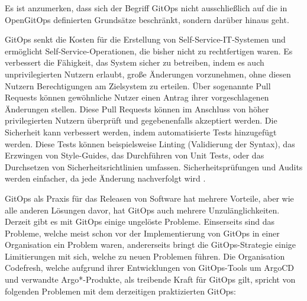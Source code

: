 Es ist anzumerken, dass sich der Begriff GitOps nicht ausschließlich auf
die in OpenGitOps definierten Grundsätze beschränkt,
sondern darüber hinaus geht.
\bigskip

GitOps senkt die Kosten für die Erstellung von Self-Service-IT-Systemen und ermöglicht Self-Service-Operationen, die bisher nicht zu rechtfertigen waren.
Es verbessert die Fähigkeit, das System sicher zu betreiben, indem es auch
unprivilegierten Nutzern erlaubt, große Änderungen vorzunehmen,
ohne diesen Nutzern Berechtigungen am Zielsystem zu erteilen.
Über sogenannte Pull Requests können gewöhnliche Nutzer einen Antrag
ihrer vorgeschlagenen Änderungen stellen.
Diese Pull Requests können im Anschluss von höher privilegierten Nutzern
überprüft und gegebenenfalls akzeptiert werden.
Die Sicherheit kann verbessert werden, 
indem automatisierte Tests hinzugefügt werden.
Diese Tests können beispielsweise
Linting (Validierung der Syntax),
das Erzwingen von Style-Guides,
das Durchführen von Unit Tests,
oder
das Durchsetzen von Sicherheitsrichtlinien
umfassen.
Sicherheitsprüfungen und Audits werden einfacher, 
da jede Änderung nachverfolgt wird
\autocite{limoncelli_gitopsPathToMoreSelfService}.
\bigskip

GitOps als Praxis für das Releasen von Software hat mehrere Vorteile, aber wie alle anderen Lösungen davor, hat GitOps auch mehrere Unzulänglichkeiten.
Derzeit gibt es mit GitOps einige ungelöste Probleme.
Einserseits sind das Probleme, welche meist schon 
vor der Implementierung von GitOps in einer Organisation
ein Problem waren,
andererseits bringt die GitOps-Strategie einige Limitierungen mit sich,
welche zu neuen Problemen führen.
Die Organisation Codefresh,
welche aufgrund ihrer Entwicklungen
von GitOps-Tools um ArgoCD und verwandte Argo*-Produkte,
als treibende Kraft für GitOps gilt,
spricht von folgenden Problemen mit dem derzeitigen praktizierten GitOps:


